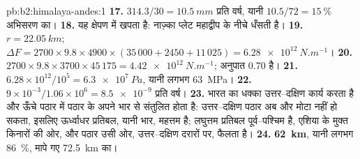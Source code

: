 \begin{solution}{pb:b2:himalaya-andes:1}
\textbf{17.} $314.3/30 = \qty{10.5}{mm}$ प्रति वर्ष, यानी $10.5/72 = \qty{15}{\percent}$
अभिसरण का।
\textbf{18.} यह क्षेपण में खपता है: नाज़्का प्लेट महाद्वीप के नीचे धँसती है।
\textbf{19.} $r = \qty{22.05}{km}$; $\Delta F = 2700\times9.8\times4900\times(35\,000 + 2450
+ 11\,025) = \qty{6.28e12}{N.m^{-1}}$।
\textbf{20.} $2700\times9.8\times3700\times45\,175 = \qty{4.42e12}{N.m^{-1}}$; अनुपात
0.70 है।
\textbf{21.} $6.28\times10^{12}/10^{5} = \qty{6.3e7}{Pa}$, यानी लगभग \qty{63}{MPa}।
\textbf{22.} $9\times10^{-3}/1.06\times10^{6} = \num{8.5e-9}$ प्रति वर्ष।
\textbf{23.} भारत का धक्का उत्तर--दक्षिण कार्य करता है और ऊँचे पठार में
पठार के अपने भार से संतुलित होता है: उत्तर--दक्षिण पठार अब और मोटा नहीं हो सकता, इसलिए ऊर्ध्वाधर प्रतिबल,
यानी भार, महत्तम है; लघुत्तम प्रतिबल पूर्व--पश्चिम है, एशिया के मुक्त किनारों की ओर,
और पठार उसी ओर, उत्तर--दक्षिण दरारों पर, फैलता है।
\textbf{24.} \textbf{\qty[text-series-to-math=true]{62}{km}}, यानी लगभग \qty{86}{\percent}, मापे गए
\qty{72.5}{km} का।
\end{solution}
